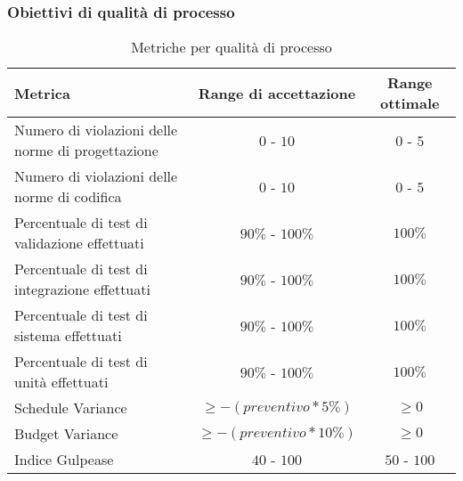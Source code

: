 \documentclass[../PianoDiQualifica.tex]{subfiles}
\begin{document}
			\subsubsection{Obiettivi di qualità di processo}\label{sez:MetrichePerQualitaDiProcesso}
				\normalsize
				\begin{table}[H]
				\center
					\begin{tabular}{|p{6.5cm}|c|c|}
						\hline
						\rowcolor{blue!30}\textbf{Metrica} & \textbf{Range di accettazione} & \textbf{Range ottimale} \\ \hline
						Numero di violazioni delle norme di progettazione & $0$ - $10$ & $0$ - $5$\\ \hline
						Numero di violazioni delle norme di codifica & $0$ - $10$ & $0$ - $5$\\ \hline
						Percentuale di test di validazione effettuati & $90\%$ - $100\%$ & $100\%$\\ \hline
						Percentuale di test di integrazione effettuati & $90\%$ - $100\%$ & $100\%$\\ \hline
						Percentuale di test di sistema effettuati & $90\%$ - $100\%$ & $100\%$\\ \hline
						Percentuale di test di unità effettuati & $90\%$ - $100\%$ & $100\%$\\ \hline
						Schedule Variance & $\geq -(preventivo*5\%)$ & $\geq 0$ \\ \hline
						Budget Variance & $\geq -(preventivo*10\%)$ & $\geq 0$ \\ \hline
						Indice Gulpease & $40$ - $100$ & $50$ - $100$ \\ \hline
					\end{tabular}
					\caption{Metriche per qualità di processo}
				\end{table}
\end{document}
